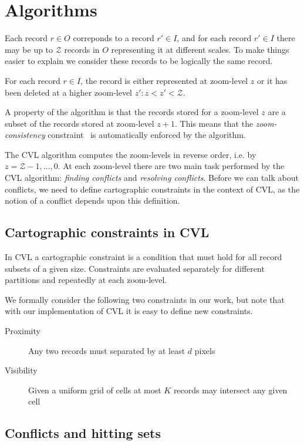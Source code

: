 \section{Algorithms}



Each record $r \in O$ correponds to a record $r' \in I$, and for each record $r' \in I$ there may be up to $\mathcal{Z}$ records in $O$ representing it at different scales. To make things easier to explain we consider these records to be logically the same record.

For each record $r \in I$, the record is either represented at zoom-level $z$ or it has been deleted at a higher zoom-level $z': z < z' < \mathcal{Z}$.

A property of the algorithm is that the records stored for a zoom-level $z$ are a subset of the records stored at zoom-level $z+1$. This means that the \emph{zoom-consistency} constraint~\cite{fusiontables} is automatically enforced by the algorithm.

The CVL algorithm computes the zoom-levels in reverse order, i.e. by $z = \mathcal{Z}-1, \dots, 0$. At each zoom-level there are two main task performed by the CVL algorithm: \emph{finding conflicts} and \emph{resolving conflicts}. Before we can talk about conflicts, we need to define cartographic constraints in the context of CVL, as the notion of a conflict depends upon this definition.

\subsection{Cartographic constraints in CVL}

In CVL a cartographic constraint is a condition that must hold for all record subsets of a given size. Constraints are evaluated separately for different partitions and repeatedly at each zoom-level.

We formally consider the following two constraints in our work, but note that with our implementation of CVL it is easy to define new constraints. 

\begin{description}
\item [Proximity] Any two records must separated by at least $d$ pixels
\item [Visibility] Given a uniform grid of cells at most $K$ records may intersect any given cell
\end{description}

\subsection{Conflicts and hitting sets}

